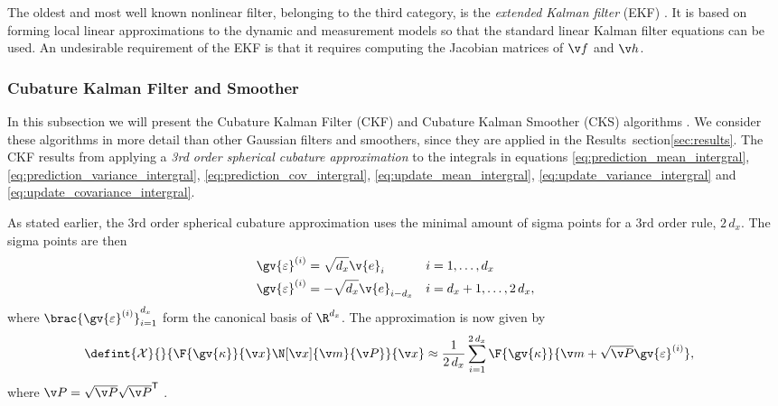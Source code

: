 The oldest and most well known nonlinear filter, belonging to the third category, is
the \emph{extended Kalman filter} (EKF) \parencite{jazwinski1970stochastic}. 
It is based on forming local linear approximations to the dynamic
and measurement models so that the standard linear Kalman filter equations can be used.
An undesirable requirement of the EKF is that it requires computing
the Jacobian matrices of $\f$ and $\h$.

\subsubsection{Cubature Kalman Filter and Smoother}
In this subsection we will present the Cubature Kalman Filter (CKF)
and Cubature Kalman Smoother (CKS) algorithms \parencite{Arasaratnam2011,Arasaratnam2009}.
We consider these algorithms in more detail than other Gaussian filters and smoothers, since
they are applied in the Results~section\ref{sec:results}. The CKF results from
applying a \emph{3rd order spherical cubature approximation} to the integrals 
in equations \eqref{eq:prediction_mean_intergral}, \eqref{eq:prediction_variance_intergral}, \eqref{eq:prediction_cov_intergral},
\eqref{eq:update_mean_intergral}, \eqref{eq:update_variance_intergral} and
\eqref{eq:update_covariance_intergral}.

As stated earlier, the 3rd order spherical cubature approximation uses the minimal amount
of sigma points for a 3rd order rule, $2\,d_x$. The sigma points are then
\begin{align}
	\gv{\varepsilon}^{(i)} &= \sqrt{d_x}\v{e}_i &  i&=1,\dots,d_x\\
	\gv{\varepsilon}^{(i)} &= -\sqrt{d_x}\v{e}_{i-d_x} & i&=d_x+1,\dots,2\,d_x,
	\label{eq:ckf_sigma}
\end{align}
where $\brac{\gv{\varepsilon}^{(i)}}_{i=1}^{d_x}$ form the canonical basis of $\R^{d_x}$. 
The approximation is now given by
\begin{align}
	\defint{\mathcal{X}}{}{\F{\gv{\kappa}}{\x}\N[\x]{\m}{\P}}{\x} &\approx 
	\frac{1}{2\,d_x} \sum_{i=1}^{2\,d_x} \F{\gv{\kappa}}{\m+\sqrt{\P}\gv{\varepsilon}^{(i)}},
	\label{eq:ckf_approx}
\end{align}%
where $\P=\sqrt{\P}\sqrt{\P}^\tr$ \parencite{Sarkka2012a,Arasaratnam2009,Wu2006}.









